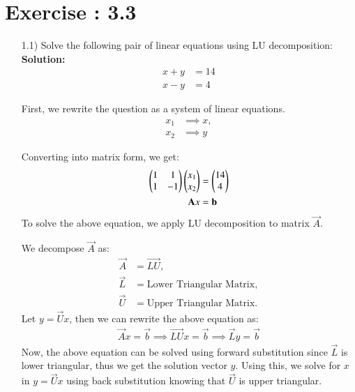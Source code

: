 \documentclass[journal]{IEEEtran}
\begin{document}
\section*{Exercise : 3.3}
\begin{enumerate}
\item [1.1)] Solve the following pair of linear equations using LU decomposition:\\
\textbf{Solution:}\\
\begin{align}
    x + y &= 14 \\
    x - y &= 4
\end{align}

First, we rewrite the question as a system of linear equations.
\begin{align}
    x_1 &\implies x, \\
    x_2 &\implies y
\end{align}

Converting into matrix form, we get:
\begin{align}
    \begin{pmatrix}1 & 1\\ 1 & -1\end{pmatrix}\begin{pmatrix}x_1 \\ x_2\end{pmatrix} &= \begin{pmatrix}14 \\ 4\end{pmatrix} \\
    \mathbf{A}x &= \mathbf{b}
\end{align}
To solve the above equation, we apply LU decomposition to matrix \(\vec{A}\).

We decompose \(\vec{A}\) as:
\begin{align}
    \vec{A} &= \vec{LU}, \\
    \vec{L} &= \text{Lower Triangular Matrix}, \\
    \vec{U} &= \text{Upper Triangular Matrix}.
\end{align}
Let \(y = \vec{U}x\), then we can rewrite the above equation as:
\begin{align}
    \vec{A}x = \vec{b} \implies \vec{LU}x = \vec{b} \implies \vec{L}y = \vec{b}
\end{align}
Now, the above equation can be solved using forward substitution since \(\vec{L}\) is lower triangular, thus we get the solution vector \(y\). Using this, we solve for \(x\) in \(y = \vec{U}x\) using back substitution knowing that \(\vec{U}\) is upper triangular.


\end{enumerate}
\end{document}
